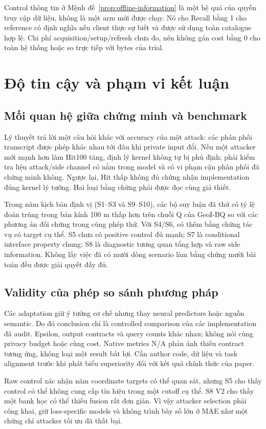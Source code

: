 Control thông tin ở Mệnh đề~\ref{prop:offline-information} là một hệ quả của quyền truy cập
dữ liệu, không là một arm mới được chạy. Nó cho Recall bằng 1 cho reference có định nghĩa nếu
client thực sự biết và được sử dụng toàn catalogue hợp lệ. Chi phí acquisition/setup/refresh
chưa đo, nên không gán cost bằng 0 cho toàn hệ thống hoặc so trực tiếp với bytes của trial.

\section{Độ tin cậy và phạm vi kết luận}\label{sec:discussion}
\subsection{Mối quan hệ giữa chứng minh và benchmark}
Lý thuyết trả lời một câu hỏi khác với accuracy của một attack: các phân phối transcript được
phép khác nhau tới đâu khi private input đổi. Nếu một attacker mới mạnh hơn làm Hit100 tăng,
định lý kernel không tự bị phủ định; phải kiểm tra liệu attack/side channel có nằm trong model và
có vi phạm cận phân phối đã chứng minh không. Ngược lại, Hit thấp không đủ chứng nhận implementation
đúng kernel lý tưởng. Hai loại bằng chứng phải được đọc cùng giả thiết.

Trong năm kịch bản định vị (S1--S3 và S9--S10), các bộ suy luận đã thử có tỷ lệ đoán trúng trong bán kính 100 m thấp hơn trên chuỗi Q của GeoI-BQ so với các phương án đối chứng trong cùng phép thử. Với S4/S6, có thêm bằng chứng tác vụ có target cụ thể. S5 chưa có positive control
đủ mạnh; S7 là conditional interface property chung; S8 là diagnostic tương quan tổng hợp và raw side
information. Không lấy việc đã có mười dòng scenario làm bằng chứng mười bài toán đều được giải quyết đầy đủ.

\subsection{Validity của phép so sánh phương pháp}
Các adaptation giữ ý tưởng cơ chế nhưng thay neural predictors hoặc nguồn semantic. Do đó conclusion
chỉ là controlled comparison của các implementation đã audit. Epsilon, output contracts và query
counts khác nhau; không nói cùng privacy budget hoặc cùng cost. Native metrics N/A phản ánh thiếu
contract tương ứng, không loại một result bất lợi. Cần author code, dữ liệu và task alignment trước
khi phát biểu superiority đối với kết quả chính thức của paper.

Raw control xác nhận năm coordinate targets có thể quan sát, nhưng S5 cho thấy control có thể không
cung cấp tín hiệu trong một cutoff cụ thể. S8 V2 cho thấy một bank học có thể thiếu fusion rất đơn giản.
Vì vậy attacker selection phải công khai, giữ loss-specific models và không trình bày số lớn ở MAE
như một chứng chỉ attacker tối ưu đã thất bại.

